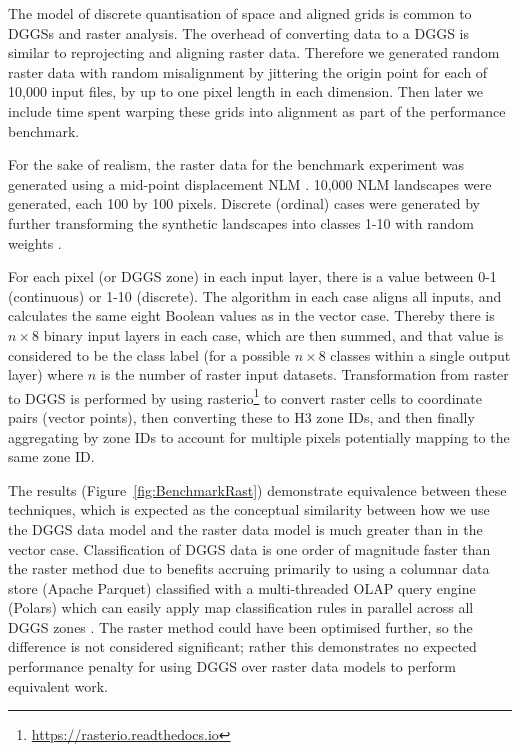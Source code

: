 \documentclass[]{interact}
\theoremstyle{plain}%
\theoremstyle{definition}
\theoremstyle{remark}
\begin{document}
The model of discrete quantisation of space and aligned grids is common to \acp{DGGS} and raster analysis. The overhead of converting data to a \ac{DGGS} is similar to reprojecting and aligning raster data. Therefore we generated random raster data with random misalignment by jittering the origin point for each of 10,000 input files, by up to one pixel length in each dimension. Then later we include time spent warping these grids into alignment as part of the performance benchmark.

For the sake of realism, the raster data for the benchmark experiment was generated using a mid-point displacement \ac{NLM} \citep{etherington2015nlm}. 10,000 \ac{NLM} landscapes were generated, each 100 by 100 pixels. Discrete (ordinal) cases were generated by further transforming the synthetic landscapes into classes 1-10 with random weights \citep{etherington2015nlm}.

For each pixel (or \ac{DGGS} zone) in each input layer, there is a value between 0-1 (continuous) or 1-10 (discrete). The algorithm in each case aligns all inputs, and calculates the same eight Boolean values as in the vector case. Thereby there is $n\times8$ binary input layers in each case, which are then summed, and that value is considered to be the class label (for a possible $n\times8$ classes within a single output layer) where $n$ is the number of raster input datasets. Transformation from raster to \ac{DGGS} is performed by using rasterio\footnote{\url{https://rasterio.readthedocs.io}} to convert raster cells to coordinate pairs (vector points), then converting these to H3 zone IDs, and then finally aggregating by zone IDs to account for multiple pixels potentially mapping to the same zone ID.

The results (Figure~\ref{fig:BenchmarkRast}) demonstrate equivalence between these techniques, which is expected as the conceptual similarity between how we use the \ac{DGGS} data model and the raster data model is much greater than in the vector case. Classification of \ac{DGGS} data is one order of magnitude faster than the raster method due to benefits accruing primarily to using a columnar data store (Apache Parquet) classified with a multi-threaded \ac{OLAP} query engine (Polars) which can easily apply map classification rules in parallel across all \ac{DGGS} zones \citep{polars}. The raster method could have been optimised further, so the difference is not considered significant; rather this demonstrates no expected performance penalty for using \ac{DGGS} over raster data models to perform equivalent work.
\end{document}
